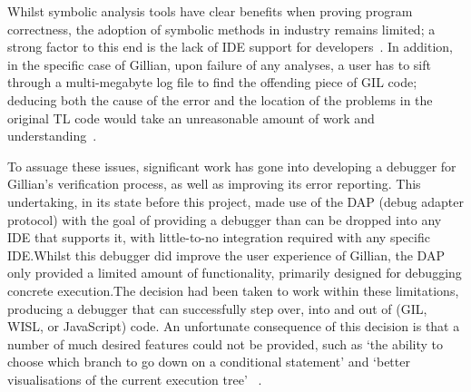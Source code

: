 Whilst symbolic analysis tools have clear benefits when proving program
correctness, the adoption of symbolic methods in industry remains limited; a
strong factor to this end is the lack of IDE support for
developers~\cite{magpiebridge}.
In addition, in the specific case of Gillian, upon failure of any analyses, a
user has to sift through a multi-megabyte log file to find the offending piece
of GIL code; deducing both the cause of the error and the location of the
problems in the original TL code would take an unreasonable amount of work and
understanding~\cite{gillian-debugging-2021}.

To assuage these issues, significant work has gone into developing a debugger
for Gillian's verification process, as well as improving its error reporting.
This undertaking, in its state before this project, made use of the DAP (debug adapter
protocol) with the goal of providing a debugger than can be dropped into any IDE that supports
it, with little-to-no integration required with any specific IDE.\@ Whilst this
debugger did improve the user experience of Gillian, the DAP only
provided a limited amount of functionality, primarily designed for debugging
concrete execution.\@ The decision had been taken to work within these
limitations, producing a debugger that can successfully step over, into and out
of (GIL, WISL, or JavaScript) code. An unfortunate consequence of this decision
is that a number of much desired features could not be provided, such as `the
ability to choose which branch to go down on a conditional statement' and
`better visualisations of the current execution tree'
~\cite[p.~49]{gillian-debugging-2021}.

